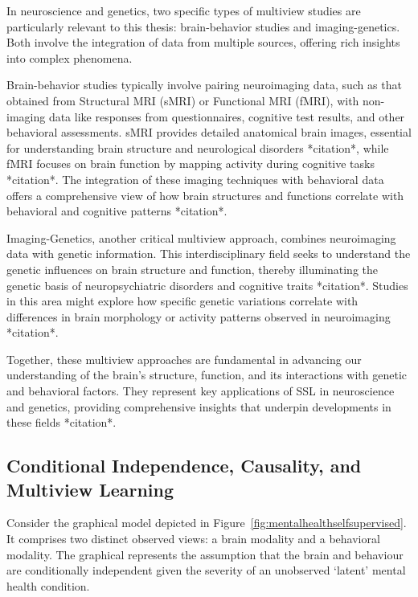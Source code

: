 In neuroscience and genetics, two specific types of multiview studies are particularly relevant to this thesis: brain-behavior studies and imaging-genetics. Both involve the integration of data from multiple sources, offering rich insights into complex phenomena.

Brain-behavior studies typically involve pairing neuroimaging data, such as that obtained from Structural MRI (sMRI) or Functional MRI (fMRI), with non-imaging data like responses from questionnaires, cognitive test results, and other behavioral assessments. sMRI provides detailed anatomical brain images, essential for understanding brain structure and neurological disorders *citation*, while fMRI focuses on brain function by mapping activity during cognitive tasks *citation*. The integration of these imaging techniques with behavioral data offers a comprehensive view of how brain structures and functions correlate with behavioral and cognitive patterns *citation*.

Imaging-Genetics, another critical multiview approach, combines neuroimaging data with genetic information. This interdisciplinary field seeks to understand the genetic influences on brain structure and function, thereby illuminating the genetic basis of neuropsychiatric disorders and cognitive traits *citation*. Studies in this area might explore how specific genetic variations correlate with differences in brain morphology or activity patterns observed in neuroimaging *citation*.

Together, these multiview approaches are fundamental in advancing our understanding of the brain's structure, function, and its interactions with genetic and behavioral factors. They represent key applications of SSL in neuroscience and genetics, providing comprehensive insights that underpin developments in these fields *citation*.

\subsection{Conditional Independence, Causality, and Multiview Learning}

Consider the graphical model depicted in Figure~\ref{fig:mentalhealthselfsupervised}.
It comprises two distinct observed \gls{views}: a brain modality and a behavioral modality.
The graphical represents the assumption that the brain and behaviour are conditionally independent given the severity of an unobserved `latent' mental health condition.

